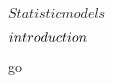 \documentclass[../Main/main]{subfiles}
\begin{document}
\unit{ $ Statistic models $ }
{
	\introduction
	{ 
		$introduction\\$ 
	}

	go

}
\end{document}
